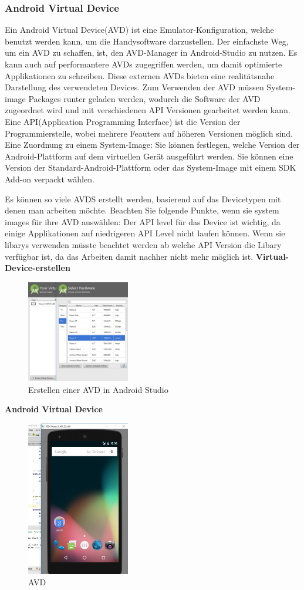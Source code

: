 \subsubsection{Android Virtual Device}
Ein Android Virtual Device(AVD) ist eine Emulator-Konfiguration, welche benutzt werden kann, um die Handysoftware darzustellen. 
Der einfachste Weg, um ein AVD zu schaffen, ist, den AVD-Manager in Android-Studio zu nutzen. 
Es kann auch auf performantere AVDs zugegriffen werden, um damit optimierte Applikationen zu schreiben.
Diese externen AVDs bieten eine realitätsnahe Darstellung des verwendeten Devices.
Zum Verwenden der AVD müssen System-image Packages runter geladen werden, wodurch die Software der AVD zugeordnet wird und mit verschiedenen API Versionen gearbeitet werden kann.
Eine API(Application Programming Interface) ist die Version der Programmierstelle, wobei mehrere Feauters auf höheren Versionen möglich sind. 
Eine Zuordnung zu einem System-Image: Sie können festlegen, welche Version der Android-Plattform auf dem virtuellen Gerät ausgeführt werden. Sie können eine Version der Standard-Android-Plattform oder das System-Image mit einem SDK Add-on verpackt wählen.

Es können so viele AVDS erstellt werden, basierend auf das Devicetypen mit denen man arbeiten möchte.
Beachten Sie folgende Punkte, wenn sie system images für ihre AVD auswählen:
Der API level für das Device ist wichtig, da einige Applikationen auf niedrigeren API Level nicht laufen können. Wenn sie libarys verwenden müsste beachtet werden ab welche API Version die Libary verfügbar ist, da das Arbeiten damit nachher nicht mehr möglich ist.
\textbf{Virtual-Device-erstellen}
\begin{figure}
	\centering
	\includegraphics[width=0.4\textwidth]{images/Create-virtual-device}
	\caption{Erstellen einer AVD in Android Studio}
\end{figure}

\textbf{Android Virtual Device}
\begin{figure}
	\centering
	\includegraphics[width=0.4\textwidth]{images/AVD}
	\caption{AVD}
\end{figure}

\clearpage %